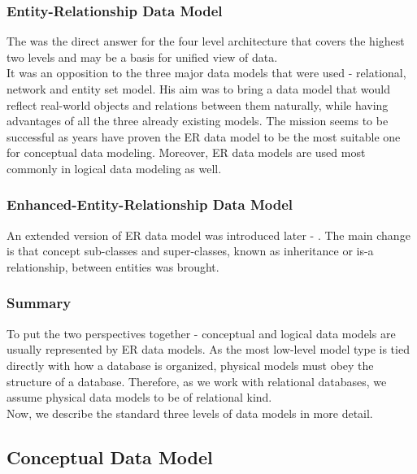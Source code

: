 \subsubsection{Entity-Relationship Data Model}

The  was the direct answer for the four level architecture\cite{Chen76theentity-relationship} that covers the highest two levels and may be a basis for unified view of data. \\
It was an opposition to the three major data models that were used - relational, network and entity set model. His aim was to bring a data model that would reflect real-world objects and relations between them naturally, while having advantages of all the three already existing models. The mission seems to be successful as years have proven the ER data model to be the most suitable one for conceptual data modeling. Moreover, ER data models are used most commonly in logical data modeling as well.

\subsubsection{Enhanced-Entity-Relationship Data Model}

An extended version of ER data model was introduced later - . The main change is that concept sub-classes and super-classes, known as inheritance or is-a relationship, between entities was brought. \\ 

\subsubsection{Summary}

To put the two perspectives together - conceptual and logical data models are usually represented by ER data models.
As the most low-level model type is tied directly with how a database is organized, physical models must obey the structure of a database. 
Therefore, as we work with relational databases, we assume physical data models to be of relational kind. \\

Now, we describe the standard three levels of data models in more detail.

\subsection{Conceptual Data Model}

